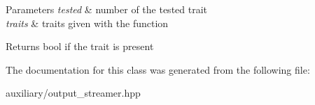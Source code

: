 \begin{DoxyParams}{Parameters}
{\em tested} & number of the tested trait \\
\hline
{\em traits} & traits given with the function\\
\hline
\end{DoxyParams}
\begin{DoxyReturn}{Returns}
bool if the trait is present 
\end{DoxyReturn}


The documentation for this class was generated from the following file\-:\begin{DoxyCompactItemize}
\item 
auxiliary/output\-\_\-streamer.\-hpp\end{DoxyCompactItemize}
